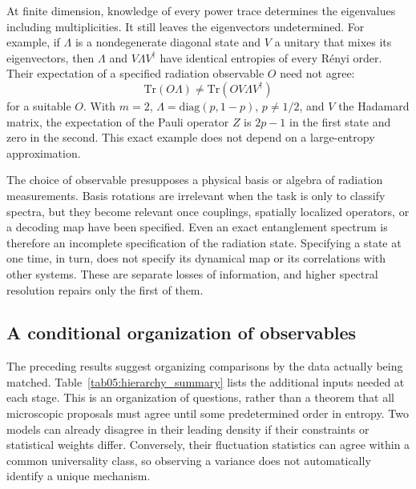 \documentclass[11pt,letterpaper]{article}
\theoremstyle{plain}
\theoremstyle{definition}
\theoremstyle{remark}
\begin{document}
At finite dimension, knowledge of every power trace determines the
eigenvalues including multiplicities.  It still leaves the eigenvectors
undetermined.  For example, if $\Lambda$ is a nondegenerate diagonal
state and $V$ a unitary that mixes its eigenvectors, then $\Lambda$
and $V\Lambda V^\dagger$ have identical entropies of every R\'enyi
order.  Their expectation of a specified radiation observable $O$
need not agree:
\begin{equation}
\label{eq05:isospectral_observables}
 \mathrm{Tr}(O\Lambda)
 \ne\mathrm{Tr}(OV\Lambda V^\dagger)
\end{equation}
for a suitable $O$.  With $m=2$, $\Lambda=\mathrm{diag}(p,1-p)$,
$p\ne1/2$, and $V$ the Hadamard matrix, the expectation of the Pauli
operator $Z$ is $2p-1$ in the first state and zero in the second.
This exact example does not depend on a large-entropy approximation.

The choice of observable presupposes a physical basis or algebra of
radiation measurements.  Basis rotations are irrelevant when the task
is only to classify spectra, but they become relevant once couplings,
spatially localized operators, or a decoding map have been specified.
Even an exact entanglement spectrum is therefore an incomplete
specification of the radiation state.  Specifying a state at one time,
in turn, does not specify its dynamical map or its correlations with
other systems.  These are separate losses of information, and higher
spectral resolution repairs only the first of them.

\subsection{A conditional organization of observables}
\label{subsec05:level_three}
\label{subsec05:summary}

The preceding results suggest organizing comparisons by the data actually
being matched.  Table~\ref{tab05:hierarchy_summary} lists the additional
inputs needed at each stage.  This is an organization of questions,
rather than a theorem that all microscopic proposals must agree until
some predetermined order in entropy.  Two models can already disagree
in their leading density if their constraints or statistical weights
differ.  Conversely, their fluctuation statistics can agree within a
common universality class, so observing a variance does not automatically
identify a unique mechanism.
\end{document}
